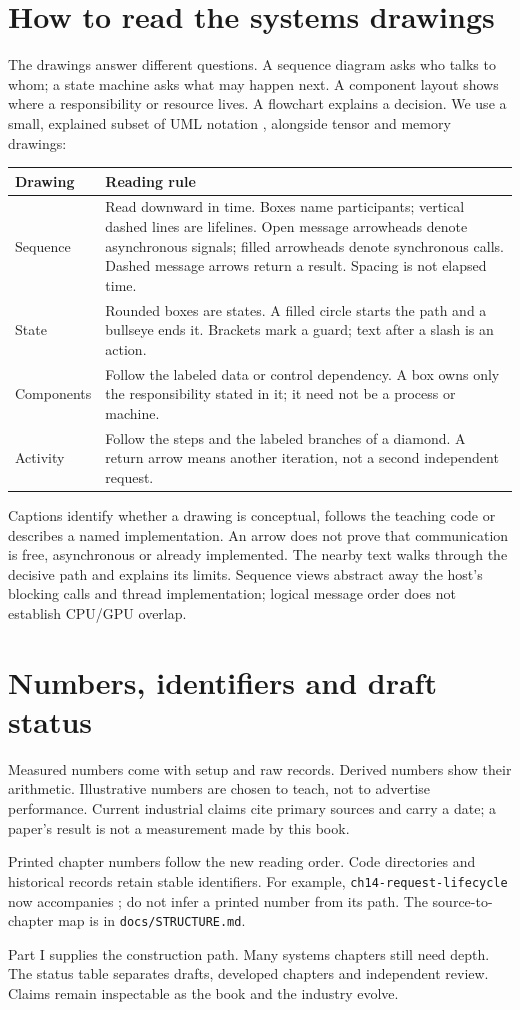 \section*{How to read the systems drawings}
The drawings answer different questions. A sequence diagram asks who talks
to whom; a state machine asks what may happen next. A component layout
shows where a responsibility or resource lives. A flowchart explains a
decision. We use a small, explained subset of UML notation
\cite{omg2017uml}, alongside tensor and memory drawings:
\begin{center}
\begin{tabularx}{\linewidth}{@{}p{28mm}X@{}}
\toprule
Drawing & Reading rule\\
\midrule
Sequence & Read downward in time. Boxes name participants; vertical dashed
lines are lifelines. Open message arrowheads denote asynchronous signals;
filled arrowheads denote synchronous calls. Dashed message arrows return
a result. Spacing is not elapsed time.\\
State & Rounded boxes are states. A filled circle starts the path and a
bullseye ends it. Brackets mark a guard; text after a slash is an action.\\
Components & Follow the labeled data or control dependency. A box owns
only the responsibility stated in it; it need not be a process or machine.\\
Activity & Follow the steps and the labeled branches of a diamond.
A return arrow means another iteration, not a second independent request.\\
\bottomrule
\end{tabularx}
\end{center}
Captions identify whether a drawing is conceptual, follows the teaching
code or describes a named implementation. An arrow does not prove that
communication is free, asynchronous or already implemented. The nearby
text walks through the decisive path and explains its limits. Sequence views
abstract away the host's blocking calls and thread implementation; logical
message order does not establish CPU/GPU overlap.

\section*{Numbers, identifiers and draft status}
Measured numbers come with setup and raw records. Derived numbers show
their arithmetic. Illustrative numbers are chosen to teach, not to
advertise performance. Current industrial claims cite primary sources
and carry a date; a paper's result is not a measurement made by this book.

Printed chapter numbers follow the new reading order. Code directories
and historical records retain stable identifiers. For example,
\texttt{ch14-request-lifecycle} now accompanies
; do not infer a printed number from its path.
The source-to-chapter map is in \texttt{docs/STRUCTURE.md}.

Part I supplies the construction path. Many systems chapters still need
depth. The status table separates drafts, developed chapters and independent
review. Claims remain inspectable as the book and the industry evolve.
